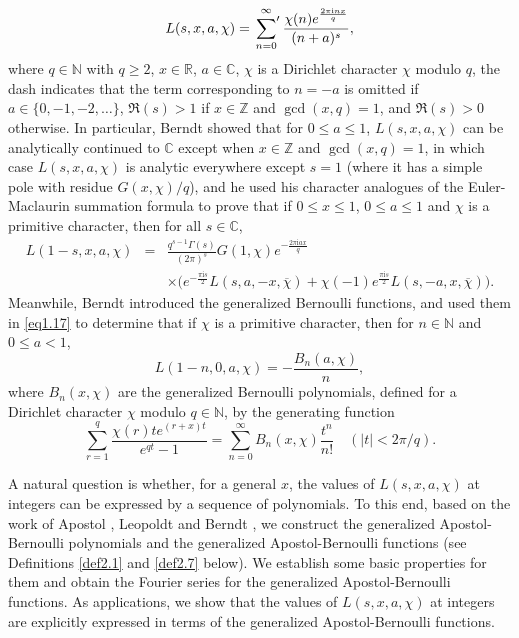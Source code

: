 \documentclass[reqno]{amsart}
\numberwithin{equation}{section}
\begin{document}
\begin{equation}\label{eq1.16}
L(s,x,a,\chi)=\sideset{}{'}\sum_{n=0}^{\infty}\frac{\chi(n)e^{\frac{2\pi \mathrm{i}nx}{q}}}{(n+a)^{s}},
\end{equation}
where $q\in\mathbb{N}$ with $q\geqslant2$, $x\in\mathbb{R}$, $a\in\mathbb{C}$, $\chi$ is a Dirichlet character $\chi$ modulo $q$, the dash indicates that the term corresponding to $n=-a$ is omitted if $a\in\{0,-1,-2,\ldots\}$, $\Re(s)>1$ if $x\in\mathbb{Z}$ and $\gcd(x,q)=1$, and $\Re(s)>0$ otherwise. In particular, Berndt \cite[Theorem 5.1]{berndt3} showed that for $0\leqslant a\leqslant 1$, $L(s,x,a,\chi)$ can be analytically continued to $\mathbb{C}$ except when $x\in\mathbb{Z}$ and $\gcd(x,q)=1$, in which case $L(s,x,a,\chi)$ is analytic everywhere except $s=1$ (where it has a simple pole with residue $G(x,\chi)/q$), and he used his character analogues of the Euler-Maclaurin summation formula to prove that if $0\leqslant x\leqslant 1$, $0\leqslant a\leqslant 1$ and $\chi$ is a primitive character, then for all $s\in\mathbb{C}$,
\begin{eqnarray}\label{eq1.17}
L(1-s,x,a,\chi)&=&\frac{q^{s-1}\Gamma(s)}{(2\pi)^{s}}G(1,\chi)e^{-\frac{2\pi \mathrm{i}ax}{q}}\nonumber\\
&&\times\bigl(e^{-\frac{\pi \mathrm{i}s}{2}}L(s,a,-x,\overline{\chi})+\chi(-1)e^{\frac{\pi \mathrm{i}s}{2}}L(s,-a,x,\overline{\chi})\bigl).
\end{eqnarray}
Meanwhile, Berndt \cite[Definition 1]{berndt3} introduced the generalized Bernoulli functions, and used them in \eqref{eq1.17} to determine that if $\chi$ is a primitive character, then for $n\in\mathbb{N}$ and $0\leqslant a<1$,
\begin{equation}\label{eq1.18}
L(1-n,0,a,\chi)=-\frac{B_{n}(a,\chi)}{n},
\end{equation}
where $B_{n}(x,\chi)$ are the generalized Bernoulli polynomials, defined for a Dirichlet character $\chi$ modulo $q\in\mathbb{N}$, by the generating function
\begin{equation}\label{eq1.19}
\sum_{r=1}^{q}\frac{\chi(r)te^{(r+x)t}}{e^{qt}-1}=\sum_{n=0}^{\infty}B_{n}(x,\chi)\frac{t^{n}}{n!}\quad(|t|<2\pi/q).
\end{equation}

A natural question is whether, for a general $x$, the values of $L(s,x,a,\chi)$ at integers can be expressed by a sequence of polynomials. To this end, based on the work of Apostol \cite{apostol2}, Leopoldt \cite{leopoldt} and Berndt \cite{berndt3}, we construct the generalized Apostol-Bernoulli polynomials and the generalized Apostol-Bernoulli functions (see Definitions \ref{def2.1} and \ref{def2.7} below). We establish some basic properties for them and obtain the Fourier series for the generalized Apostol-Bernoulli functions. As applications, we show that the values of $L(s,x,a,\chi)$ at integers are explicitly expressed in terms of the generalized Apostol-Bernoulli functions.
\end{document}
